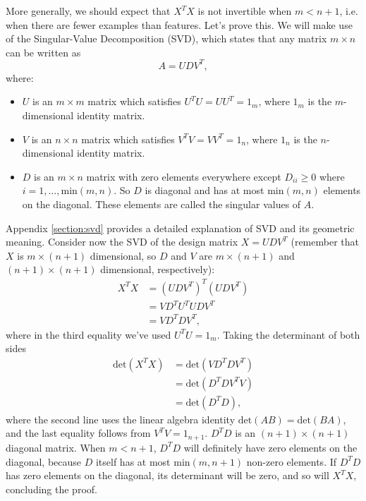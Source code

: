 \documentclass{article}
\theoremstyle{definition}
\begin{document}
More generally, we should expect that $X^TX$ is not invertible when $m<n+1$, i.e. when there are fewer examples than features.
Let's prove this. We will make use of the Singular-Value Decomposition (SVD), which states that any matrix $m\times n$ can be written as
\begin{equation}
    A = UDV^T,
\end{equation}
where:
\begin{itemize}
    \item $U$ is an $m\times m$ matrix which satisfies $U^TU=UU^T=1_m$, where $1_m$ is the $m$-dimensional identity matrix.
    \item $V$ is an $n\times n$ matrix which satisfies $V^TV=VV^T=1_n$, where $1_n$ is the $n$-dimensional identity matrix.
    \item $D$ is an $m\times n$ matrix with zero elements everywhere except $D_{ii}\ge0$ where $i=1,\dots,\text{min}(m, n)$. So $D$ is diagonal and has at most $\text{min}(m, n)$ elements on the diagonal. These elements are called the singular values of $A$.
\end{itemize}
Appendix \ref{section:svd} provides a detailed explanation of SVD and its geometric meaning. Consider now the SVD of the design matrix $X=UDV^T$ (remember that $X$ is $m\times (n+1)$ dimensional, so $D$ and $V$ are $m\times (n+1)$ and $(n+1)\times (n+1)$ dimensional, respectively):
\begin{align*}
    X^TX &= (UDV^T)^T(UDV^T)\\
    &= VD^TU^TUDV^T \\
    &=VD^TDV^T,
\end{align*}
where in the third equality we've used $U^TU=1_m$. Taking the determinant of both sides
\begin{align*}
    \text{det}(X^TX) &= \text{det}(VD^TDV^T)\\
    &= \text{det}(D^TDV^TV) \\
    &= \text{det}(D^TD),
\end{align*}
where the second line uses the linear algebra identity $\text{det}(AB)=\text{det}(BA)$, and the last equality follows from $V^TV=1_{n+1}$. $D^TD$ is an $(n+1)\times(n+1)$ diagonal matrix. When $m<n+1$, $D^TD$ will definitely have zero elements on the diagonal, because $D$ itself has at most $\text{min}(m,n+1)$ non-zero elements. If $D^TD$ has zero elements on the diagonal, its determinant will be zero, and so will $X^TX$, concluding the proof.
\end{document}
